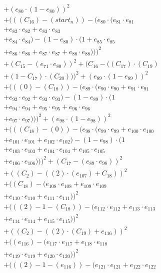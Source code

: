 \documentclass[10pt, a4paper]{article}
\begin{document}
\begin{small}
\begin{align*}
& + (e_{80} \cdot (1 - e_{80}))^{2} \\
& + (((C_{16}) - (start_n)) - (e_{80} \cdot (e_{81} \cdot e_{81} \\
& + e_{82} \cdot e_{82} + e_{83} \cdot e_{83} \\
& + e_{84} \cdot e_{84}) - (1 - e_{80}) \cdot (1 + e_{85} \cdot e_{85} \\
& + e_{86} \cdot e_{86} + e_{87} \cdot e_{87} + e_{88} \cdot e_{88})))^{2} \\
& + (C_{15} - (e_{71} \cdot e_{80}))^{2} + (C_{16} - ((C_{17})  \cdot  (C_{19}) \\
& + (1 - C_{17})  \cdot  (C_{20})))^{2} + (e_{89} \cdot (1 - e_{89}))^{2} \\
& + (((0) - (C_{18})) - (e_{89} \cdot (e_{90} \cdot e_{90} + e_{91} \cdot e_{91} \\
& + e_{92} \cdot e_{92} + e_{93} \cdot e_{93}) - (1 - e_{89}) \cdot (1 \\
& + e_{94} \cdot e_{94} + e_{95} \cdot e_{95} + e_{96} \cdot e_{96} \\
& + e_{97} \cdot e_{97})))^{2} + (e_{98} \cdot (1 - e_{98}))^{2} \\
& + (((C_{18}) - (0)) - (e_{98} \cdot (e_{99} \cdot e_{99} + e_{100} \cdot e_{100} \\
& + e_{101} \cdot e_{101} + e_{102} \cdot e_{102}) - (1 - e_{98}) \cdot (1 \\
& + e_{103} \cdot e_{103} + e_{104} \cdot e_{104} + e_{105} \cdot e_{105} \\
& + e_{106} \cdot e_{106})))^{2} + (C_{17} - (e_{89} \cdot e_{98}))^{2} \\
& + ((C_{2}) - ((2)  \cdot  (e_{107}) + C_{18}))^{2} \\
& + ((C_{18}) - (e_{108} \cdot e_{108} + e_{109} \cdot e_{109} \\
& + e_{110} \cdot e_{110} + e_{111} \cdot e_{111}))^{2} \\
& + (((2) - 1 - (C_{18})) - (e_{112} \cdot e_{112} + e_{113} \cdot e_{113} \\
& + e_{114} \cdot e_{114} + e_{115} \cdot e_{115}))^{2} \\
& + ((C_{2}) - ((2)  \cdot  (C_{19}) + e_{116}))^{2} \\
& + ((e_{116}) - (e_{117} \cdot e_{117} + e_{118} \cdot e_{118} \\
& + e_{119} \cdot e_{119} + e_{120} \cdot e_{120}))^{2} \\
& + (((2) - 1 - (e_{116})) - (e_{121} \cdot e_{121} + e_{122} \cdot e_{122} \\

\end{align*}
\end{small}
\end{document}
